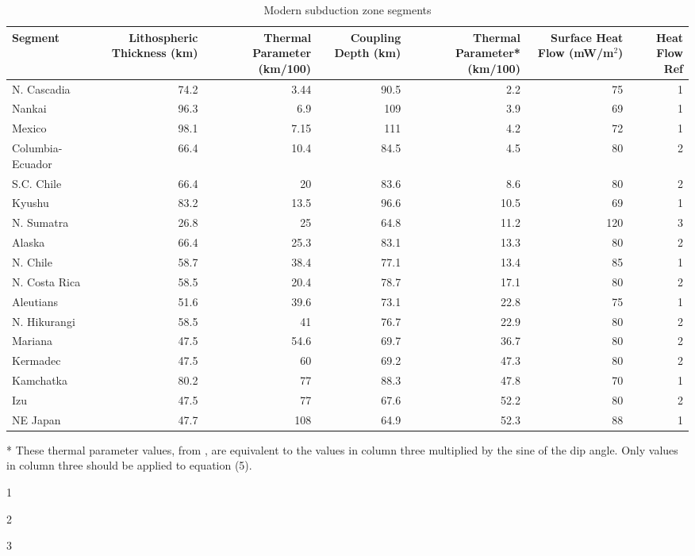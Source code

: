 \documentclass{article}
\begin{document}
	
\begin{table}
	\begin{threeparttable}
		\captionsetup{labelformat=empty}
		\caption{Modern subduction zone segments}
	\setlength{\tabcolsep}{4pt}
	\begin{tabularx}{\textwidth}{L{1.5} R{1} R{1} R{1} R{1} R{1} R{0.5}}
		
		\toprule
		
		Segment & Lithospheric Thickness (km) & Thermal Parameter (km/100) & Coupling Depth (km) & Thermal Parameter* (km/100) & Surface Heat Flow (mW/m$^2$) & Heat Flow Ref \\
		
		\midrule
		
		N. Cascadia & 74.2 & 3.44 & 90.5 & 2.2 & 75 & 1\\
		Nankai & 96.3 & 6.9 & 109 & 3.9 & 69 & 1 \\
		Mexico & 98.1 & 7.15 & 111 & 4.2 & 72 & 1
\\
		Columbia-Ecuador & 66.4 & 10.4 & 84.5 & 4.5 & 80 & 2 \\
		S.C. Chile & 66.4 & 20 & 83.6 & 8.6 & 80 & 2
\\
		Kyushu & 83.2 & 13.5 & 96.6 & 10.5 & 69 & 1
\\
		N. Sumatra & 26.8 & 25 & 64.8 & 11.2 & 120 & 3
\\
		Alaska & 66.4 & 25.3 & 83.1 & 13.3 & 80 & 2
\\
		N. Chile & 58.7 & 38.4 & 77.1 & 13.4 & 85 & 1
\\
		N. Costa Rica & 58.5 & 20.4 & 78.7 & 17.1 & 80 & 2
\\
		Aleutians & 51.6 & 39.6 & 73.1 & 22.8 & 75 & 1
\\
		N. Hikurangi & 58.5 & 41 & 76.7 & 22.9 & 80 & 2
\\
		Mariana & 47.5 & 54.6 & 69.7 & 36.7 & 80 & 2
\\
		Kermadec & 47.5 & 60 & 69.2 & 47.3 & 80 & 2
\\
		Kamchatka & 80.2 & 77 & 88.3 & 47.8 & 70 & 1
\\
		Izu & 47.5 & 77 & 67.6 & 52.2 & 80 & 2
\\
		NE Japan & 47.7 & 108 & 64.9 & 52.3 & 88 & 1
\\
		
		\bottomrule
		
		
	\end{tabularx}
\begin{tablenotes}
	\item [*] These thermal parameter values, from \cite{Wada2009}, are equivalent to the values in column three multiplied by the sine of the dip angle. Only values in column three should be applied to equation (5).
	\item [1] \cite{Currie2006}
	\item [2] \cite[Global average from]{Currie2006}
	\item [3] \cite{Wada2009}
\end{tablenotes}
\end{threeparttable}
\end{table}
\end{document}
